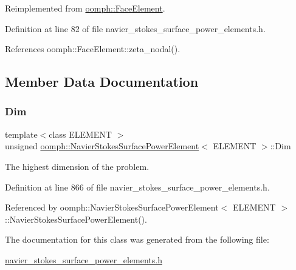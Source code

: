 Reimplemented from \hyperlink{classoomph_1_1FaceElement_a58c9f93705c7741f76c8487d152e68a6}{oomph\+::\+Face\+Element}.



Definition at line 82 of file navier\+\_\+stokes\+\_\+surface\+\_\+power\+\_\+elements.\+h.



References oomph\+::\+Face\+Element\+::zeta\+\_\+nodal().



\subsection{Member Data Documentation}
\mbox{\label{classoomph_1_1NavierStokesSurfacePowerElement_a233c38a6ae3484b4c5b06f7c7b087658}} 
\subsubsection{\texorpdfstring{Dim}{Dim}}
{\footnotesize\ttfamily template$<$class E\+L\+E\+M\+E\+NT $>$ \\
unsigned \hyperlink{classoomph_1_1NavierStokesSurfacePowerElement}{oomph\+::\+Navier\+Stokes\+Surface\+Power\+Element}$<$ E\+L\+E\+M\+E\+NT $>$\+::Dim\hspace{0.3cm}{\ttfamily [private]}}



The highest dimension of the problem. 



Definition at line 866 of file navier\+\_\+stokes\+\_\+surface\+\_\+power\+\_\+elements.\+h.



Referenced by oomph\+::\+Navier\+Stokes\+Surface\+Power\+Element$<$ E\+L\+E\+M\+E\+N\+T $>$\+::\+Navier\+Stokes\+Surface\+Power\+Element().



The documentation for this class was generated from the following file\+:\begin{DoxyCompactItemize}
\item 
\hyperlink{navier__stokes__surface__power__elements_8h}{navier\+\_\+stokes\+\_\+surface\+\_\+power\+\_\+elements.\+h}\end{DoxyCompactItemize}
